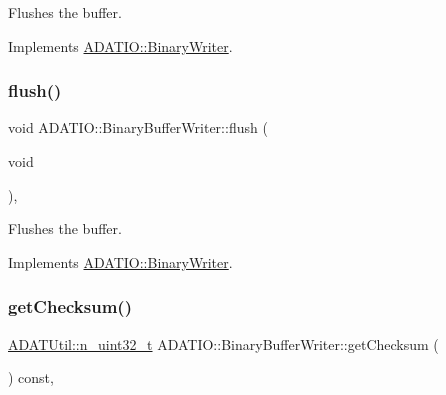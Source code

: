 Flushes the buffer. 



Implements \mbox{\hyperlink{classADATIO_1_1BinaryWriter_a1d335eeed64094b8641f3ebf731c981e}{A\+D\+A\+T\+I\+O\+::\+Binary\+Writer}}.

\mbox{\label{classADATIO_1_1BinaryBufferWriter_accc3319508a804b054d21b6bddeef85d}} 
\subsubsection{\texorpdfstring{flush()}{flush()}\hspace{0.1cm}{\footnotesize\ttfamily [3/3]}}
{\footnotesize\ttfamily void A\+D\+A\+T\+I\+O\+::\+Binary\+Buffer\+Writer\+::flush (\begin{DoxyParamCaption}\item[{void}]{ }\end{DoxyParamCaption})\hspace{0.3cm}{\ttfamily [inline]}, {\ttfamily [virtual]}}



Flushes the buffer. 



Implements \mbox{\hyperlink{classADATIO_1_1BinaryWriter_a1d335eeed64094b8641f3ebf731c981e}{A\+D\+A\+T\+I\+O\+::\+Binary\+Writer}}.

\mbox{\label{classADATIO_1_1BinaryBufferWriter_a3d7ec1583f03981f0a84571646be46f3}} 
\subsubsection{\texorpdfstring{getChecksum()}{getChecksum()}\hspace{0.1cm}{\footnotesize\ttfamily [1/3]}}
{\footnotesize\ttfamily \mbox{\hyperlink{namespaceADATUtil_ad945a8afa4db2d1f89b731964adae97e}{A\+D\+A\+T\+Util\+::n\+\_\+uint32\+\_\+t}} A\+D\+A\+T\+I\+O\+::\+Binary\+Buffer\+Writer\+::get\+Checksum (\begin{DoxyParamCaption}{ }\end{DoxyParamCaption}) const\hspace{0.3cm}{\ttfamily [inline]}, {\ttfamily [virtual]}}



